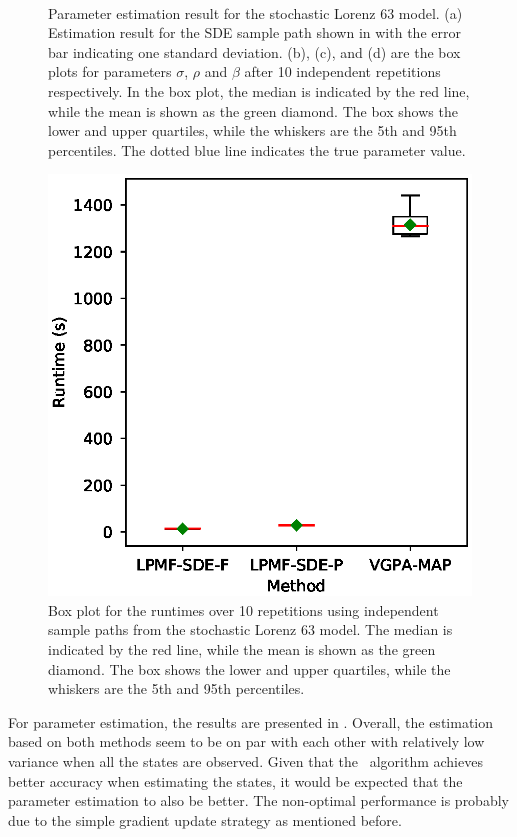 \begin{figure}
\begin{subfigure}{0.48\textwidth}
        \caption{\ }
        \label{fig-lorenz-63-parameters-beta-boxplot}
    \end{subfigure}
    \caption{Parameter estimation result for the stochastic Lorenz 63 model. (a) Estimation result for the SDE sample path shown in  with the error bar indicating one standard deviation. (b), (c), and (d) are the box plots for parameters $\sigma$,  $\rho$ and $\beta$ after 10 independent repetitions respectively. In the box plot, the median is indicated by the red line, while the mean is shown as the green diamond. The box shows the lower and upper quartiles, while the whiskers are the 5th and 95th percentiles. The dotted blue line indicates the true parameter value.}
    \label{fig-lorenz-63-parameters-group}
\end{figure}

\begin{figure}
    \centering
    \includegraphics[width=0.48\linewidth]{graphics/lorenz-63-runtime-boxplot}
    \caption{Box plot for the runtimes over 10 repetitions using independent sample paths from the stochastic Lorenz 63 model. The median is indicated by the red line, while the mean is shown as the green diamond. The box shows the lower and upper quartiles, while the whiskers are the 5th and 95th percentiles.}
    \label{fig-lorenz-63-runtime-boxplot}    
\end{figure}

For parameter estimation, the results are presented in .
Overall, the estimation based on both methods seem to be on par with each other with relatively low variance when all the states are observed.
Given that the \algovgpamap\ algorithm achieves better accuracy when estimating the states, it would be expected that the parameter estimation to also be better.
The non-optimal performance is probably due to the simple gradient update strategy as mentioned before.

